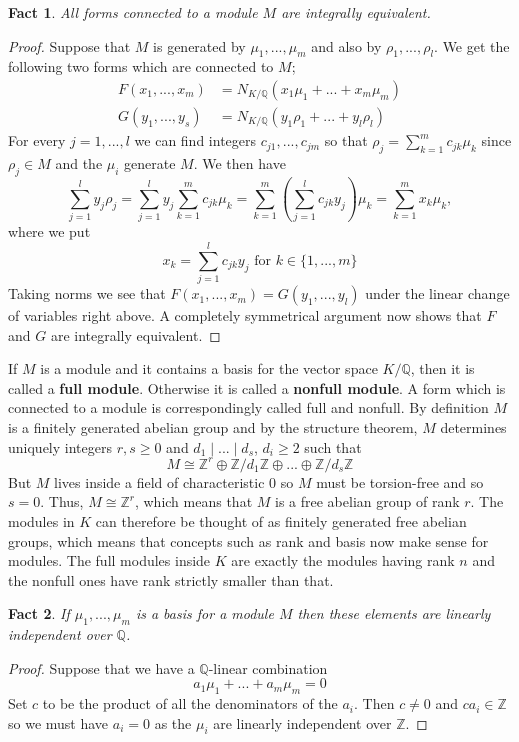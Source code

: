 \documentclass{article}
\newtheorem{fact}{Fact}[section]
\newcommand{\mbb}[1]{\mathbb{#1}}
\numberwithin{equation}{section}
\begin{document}
\begin{fact}\label{fact: Forms connected to module are equivalent}
    All forms connected to a module $M$ are integrally equivalent.
\end{fact}
\begin{proof}
    Suppose that $M$ is generated by $\mu_1, ..., \mu_m$ and also by $\rho_1, ...,\rho_l$. We get the following two forms which are connected to $M$;
    \begin{align*}
        F(x_1, ..., x_m) &= N_{K/\mbb Q}(x_1 \mu_1 + ... + x_m \mu_m) \\ G(y_1, ..., y_s) &= N_{K/\mbb Q}(y_1 \rho_1 + ... + y_l \rho_l)
    \end{align*}
    For every $j = 1, ..., l$ we can find integers $c_{j1}, ..., c_{jm}$ so that
    $\rho_j = \sum_{k=1}^m c_{jk} \mu_k$ since $\rho_j \in M$ and the $\mu_i$ generate $M$. We then have
    $$\sum_{j=1}^l y_j \rho_j = \sum_{j=1}^l y_j \sum_{k=1}^m c_{jk} \mu_k = \sum_{k=1}^m (\sum_{j=1}^l c_{jk} y_j) \mu_k = \sum_{k=1}^m x_k \mu_k,$$
    where we put 
    \begin{equation*}
        x_k = \sum_{j=1}^l c_{jk} y_j \text{ for } k \in \{1, ..., m\}
    \end{equation*}
    Taking norms we see that $F(x_1, ..., x_m) = G(y_1, ..., y_l)$ under the linear change of variables right above. A completely symmetrical argument now shows that $F$ and $G$ are integrally equivalent.
\end{proof}
If $M$ is a module and it contains a basis for the vector space $K / \mbb{Q}$, then it is called a \textbf{full module}. Otherwise it is called a \textbf{nonfull module}. A form which is connected to a module is correspondingly called full and nonfull. By definition $M$ is a finitely generated abelian group and by the structure theorem, $M$ determines uniquely integers $r,s \geq 0$ and $d_1 \mid ... \mid d_s$, $d_i \geq 2$ such that
$$M \cong \mbb{Z}^r \oplus \mbb{Z}/d_1\mbb{Z} \oplus ... \oplus \mbb{Z}/d_s\mbb{Z} $$
But $M$ lives inside a field of characteristic 0 so $M$ must be torsion-free and so $s = 0$. Thus, $M \cong \mbb{Z}^r$, which means that $M$ is a free abelian group of rank $r$. The modules in $K$ can therefore be thought of as finitely generated free abelian groups, which means that concepts such as rank and basis now make sense for modules. The full modules inside $K$ are exactly the modules having rank $n$ and the nonfull ones have rank strictly smaller than that.

\begin{fact}\label{lem: Basis for module is linearly independent over Q}
    If $\mu_1, ..., \mu_m$ is a basis for a module $M$ then these elements are linearly independent over $\mbb Q$.
\end{fact}
\begin{proof}
    Suppose that we have a $\mbb Q$-linear combination
    $$a_1 \mu_1 + ... + a_m \mu_m = 0$$
    Set $c$ to be the product of all the denominators of the $a_i$. Then $c \neq 0$ and $ca_i \in \mbb Z$ so we must have $a_i = 0$ as the $\mu_i$ are linearly independent over $\mbb Z$.
\end{proof}
\end{document}
